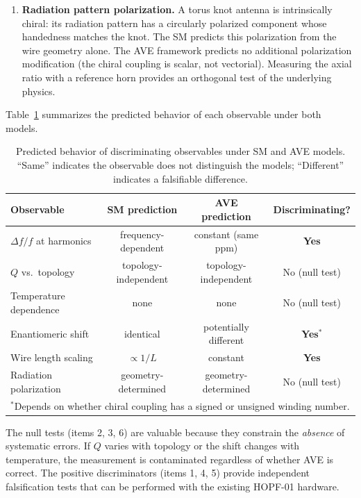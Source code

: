 \begin{enumerate}
    \item \textbf{Radiation pattern polarization.} A torus knot antenna is intrinsically chiral: its radiation pattern has a circularly polarized component whose handedness matches the knot. The SM predicts this polarization from the wire geometry alone. The AVE framework predicts no additional polarization modification (the chiral coupling is scalar, not vectorial). Measuring the axial ratio with a reference horn provides an orthogonal test of the underlying physics.
\end{enumerate}

Table~\ref{tab:discriminators} summarizes the predicted behavior of each observable under both models.

\begin{table}[ht]
\centering
\caption{Predicted behavior of discriminating observables under SM and AVE models. ``Same'' indicates the observable does not distinguish the models; ``Different'' indicates a falsifiable difference.}
\label{tab:discriminators}
\begin{tabular}{|l|c|c|c|}
\hline
Observable & SM prediction & AVE prediction & Discriminating? \\ \hline
$\Delta f/f$ at harmonics     & frequency-dependent         & constant (same ppm)         & \textbf{Yes} \\
$Q$ vs.\ topology              & topology-independent        & topology-independent        & No (null test)  \\
Temperature dependence         & none                        & none                        & No (null test)  \\
Enantiomeric shift             & identical                   & potentially different       & \textbf{Yes}$^*$ \\
Wire length scaling            & $\propto 1/L$               & constant                    & \textbf{Yes} \\
Radiation polarization         & geometry-determined         & geometry-determined          & No (null test)  \\ \hline
\multicolumn{4}{l}{\footnotesize $^*$Depends on whether chiral coupling has a signed or unsigned winding number.}
\end{tabular}
\end{table}

\noindent The null tests (items 2, 3, 6) are valuable because they constrain the \textit{absence} of systematic errors. If $Q$ varies with topology or the shift changes with temperature, the measurement is contaminated regardless of whether AVE is correct. The positive discriminators (items 1, 4, 5) provide independent falsification tests that can be performed with the existing HOPF-01 hardware.

